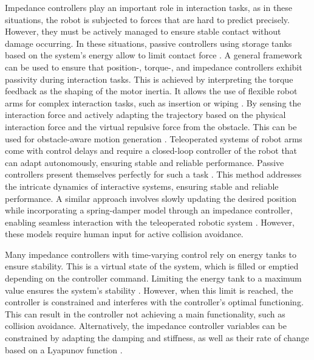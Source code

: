Impedance controllers play an important role in interaction tasks, as in these situations, the robot is subjected to forces that are hard to predict precisely. However, they must be actively managed to ensure stable contact without damage occurring. In these situations, passive controllers using storage tanks based on the system's energy allow to limit contact force \parencite{kishi2003passive}.
A general framework can be used to ensure that position-, torque-, and impedance controllers exhibit passivity during interaction tasks. This is achieved by interpreting the torque feedback as the shaping of the motor inertia. It allows the use of flexible robot arms for complex interaction tasks, such as insertion or wiping \parencite{albu2007unified}. 
By sensing the interaction force and actively adapting the trajectory based on the physical interaction force and the virtual repulsive force from the obstacle. This can be used for obstacle-aware motion generation \parencite{haddadin2010real}.
Teleoperated systems of robot arms come with control delays and require a closed-loop controller of the robot that can adapt autonomously, ensuring stable and reliable performance. Passive controllers present themselves perfectly for such a task  \parencite{stramigioli2005sampled}. This method addresses the intricate dynamics of interactive systems, ensuring stable and reliable performance.
A similar approach involves slowly updating the desired position while incorporating a spring-damper model through an impedance controller, enabling seamless interaction with the teleoperated robotic system \parencite{lee2010passive}.
However, these models require human input for active collision avoidance.

Many impedance controllers with time-varying control rely on energy tanks to ensure stability. This is a virtual state of the system, which is filled or emptied depending on the controller command. Limiting the energy tank to a maximum value ensures the system's stability  \parencite{ferraguti2013tank}. However, when this limit is reached, the controller is constrained and interferes with the controller's optimal functioning. This can result in the controller not achieving a main functionality, such as collision avoidance.
Alternatively, the impedance controller variables can be constrained by adapting the damping and stiffness, as well as their rate of change based on a Lyapunov function \cite{kronander2016stability}.

